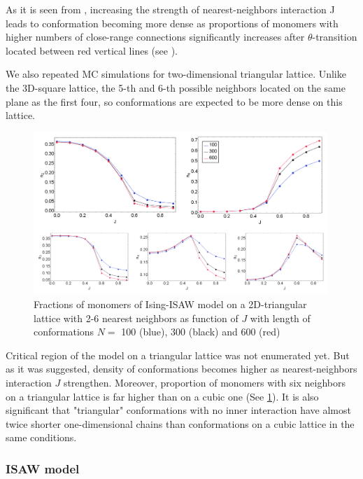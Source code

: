 \documentclass[aps,pre,amssymb,amsmath,twocolumn,floatfix]{revtex4-2}
\begin{document}
As it is seen from  , increasing the strength of nearest-neighbors interaction J leads to conformation becoming more dense as proportions of monomers with higher numbers of close-range connections significantly increases after $\theta$-transition located between red vertical lines (see ).

We also repeated MC simulations for two-dimensional triangular lattice. Unlike the 3D-square lattice, the 5-th and 6-th possible neighbors located on the same plane as the first four, so conformations are expected to be more dense on this lattice.

\begin{figure}
    \centering
    \includegraphics[keepaspectratio=True, width=0.99\textwidth]{Images/TrIsing_Complex.png}
    \caption{Fractions of monomers of Ising-ISAW model on a 2D-triangular lattice with 2-6 nearest neighbors as function of $J$ with length of conformations $N = $ 100 (blue), 300 (black) and 600 (red)}
    \label{fig:TrIsing}
\end{figure}

Critical region of the model on a triangular lattice was not enumerated yet. But as it was suggested, density of conformations becomes higher as nearest-neighbors interaction $J$ strengthen. Moreover, proportion of monomers with six neighbors on a triangular lattice is far higher than on a cubic one (See \cref{fig:TrIsing}). It is also significant that "triangular" conformations with no inner interaction have almost twice shorter one-dimensional chains than conformations on a cubic lattice in the same conditions.

\subsubsection{ISAW model}
\end{document}
